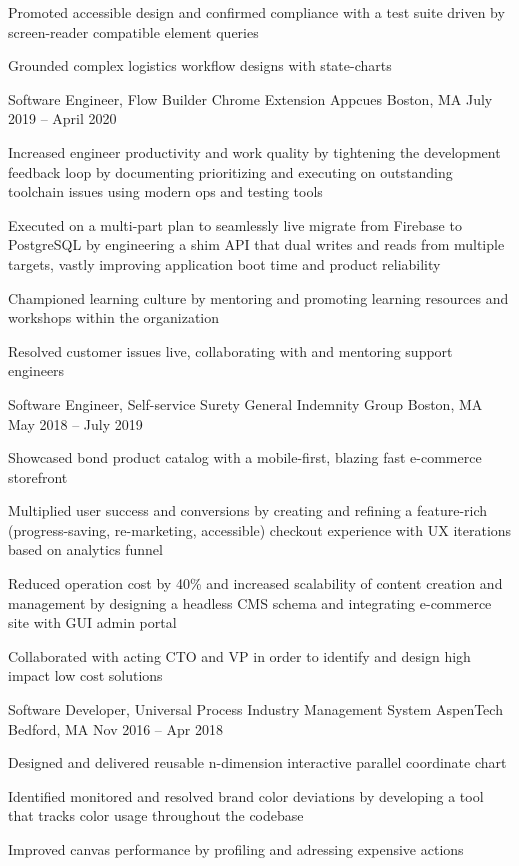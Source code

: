 \documentclass[]{awesome-cv}
\begin{document}
\begin{cventries}
{\begin{cvitems}
		\item {Promoted accessible design and confirmed compliance with a test suite driven by screen-reader compatible element queries}
		\item {Grounded complex logistics workflow designs with state-charts}
		\end{cvitems}}
	\cventry
	{Software Engineer, Flow Builder Chrome Extension}
	{Appcues}
	{Boston, MA}
	{July 2019 – April 2020}
	{\begin{cvitems}
		\item {Increased engineer productivity and work quality by tightening the development feedback loop by documenting prioritizing and executing on outstanding toolchain issues using modern ops and testing tools}
		\item {Executed on a multi-part plan to seamlessly live migrate from Firebase to PostgreSQL by engineering a shim API that dual writes and reads from multiple targets, vastly improving application boot time and product reliability}
		\item {Championed learning culture by mentoring and promoting learning resources and workshops within the organization}
		\item {Resolved customer issues live, collaborating with and mentoring support engineers}
		\end{cvitems}}
	\cventry
	{Software Engineer, Self-service Surety}
	{General Indemnity Group}
	{Boston, MA}
	{May 2018 – July 2019}
	{\begin{cvitems}
		\item {Showcased bond product catalog with a mobile-first, blazing fast e-commerce storefront}
		\item {Multiplied user success and conversions by creating and refining a feature-rich (progress-saving, re-marketing, accessible) checkout experience with UX iterations based on analytics funnel}
		\item {Reduced operation cost by 40\% and increased scalability of content creation and management by designing a headless CMS schema and integrating e-commerce site with GUI admin portal}
		\item {Collaborated with acting CTO and VP in order to identify and design high impact low cost solutions}
		\end{cvitems}}
	\cventry
	{Software Developer, Universal Process Industry Management System} 
	{AspenTech}
	{Bedford, MA}
	{Nov 2016 – Apr 2018}
	{\begin{cvitems}
		\item {Designed and delivered reusable n-dimension interactive parallel coordinate chart}
		\item {Identified monitored and resolved brand color deviations by developing a tool that tracks color usage throughout the codebase}
		\item {Improved canvas performance by profiling and adressing expensive actions}
		\end{cvitems}}
\end{cventries}
\end{document}
